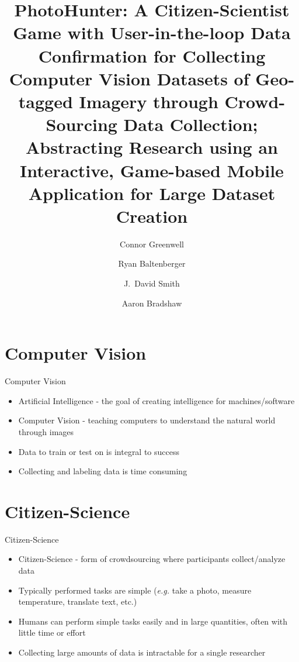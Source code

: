\documentclass[aspectratio=169]{beamer}
\title[PhotoHunter]{PhotoHunter: A Citizen-Scientist Game with User-in-the-loop 
  Data Confirmation for Collecting Computer Vision Datasets of 
  Geo-tagged Imagery through Crowd-Sourcing Data Collection; 
  Abstracting Research using an Interactive, Game-based Mobile 
  Application for Large Dataset Creation}
\author[]{Connor Greenwell \and Ryan Baltenberger 
  \and J.\ David Smith \and Aaron Bradshaw}
\institute{QuesoTech.com}
\begin{document}
\maketitle

\section{Computer Vision}

\begin{frame}{Computer Vision}
  \begin{itemize}

    \item Artificial Intelligence - the goal of creating intelligence for
          machines/software

    \item Computer Vision - teaching computers to understand the natural world
          through images

    \item Data to train or test on is integral to success

    \item Collecting and labeling data is time consuming

  \end{itemize}
\end{frame}

\section{Citizen-Science}

\begin{frame}{Citizen-Science}
  \begin{itemize}
    
    \item Citizen-Science - form of crowdsourcing where participants
          collect/analyze data

    \item Typically performed tasks are simple (\textit{e.g.} take a photo,
          measure temperature, translate text, etc.)

    \item Humans can perform simple tasks easily and in large quantities,
          often with little time or effort

    \item Collecting large amounts of data is intractable for a single 
          researcher

  \end{itemize}
\end{frame}
\end{document}
